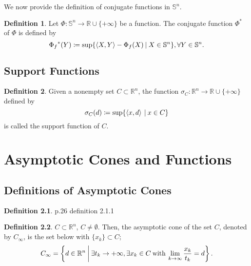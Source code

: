 \documentclass[a4paper,11pt, oneside]{book}
\theoremstyle{definition}
\newtheorem{dfn}{Definition}[section]
\newcommand{\RealNumberSet}{\mathbb{R}}
\newcommand{\NDemenstionalRealEuclideanSpace}{\mathbb{R}^n}
\newcommand{\NDemenstionalRealSymmetricMatrixSpace}{\mathbb{S}^n}
\newcommand{\InnerProduct}[2]{\left\langle {#1},{#2}\right\rangle} %
\newcommand{\ExtendedRealValuedFunction}[2]{{#1}: {#2} \to \RealNumberSet \cup \{+\infty\}}
\newcommand{\ConjugateFunction}[1]{{#1}^*}
\begin{document}
We now provide the definition of conjugate functions in $\NDemenstionalRealSymmetricMatrixSpace$.

\begin{dfn}
  Let $\ExtendedRealValuedFunction{\Phi}{\NDemenstionalRealSymmetricMatrixSpace}$ be a function. The conjugate function $\ConjugateFunction{\Phi}$ of $\Phi$ is defined by
  \begin{equation}
    {\Phi_{f}}^* (Y) \coloneqq \sup \{\InnerProduct{X}{Y} - \Phi_{f} (X) \:|\: X \in \NDemenstionalRealSymmetricMatrixSpace\}, \forall Y \in \NDemenstionalRealSymmetricMatrixSpace. \notag
  \end{equation}
\end{dfn}

\section{Support Functions}

\begin{dfn}
  Given a nonempty set $C \subset \NDemenstionalRealEuclideanSpace$, the function $\ExtendedRealValuedFunction{\sigma_C}{\NDemenstionalRealEuclideanSpace}$ defined by
  \begin{equation}
    \sigma_C (d) \coloneqq \sup\{\InnerProduct{x}{d} \:|\: x \in C\} \notag
  \end{equation}
  is called the support function of $C$.
\end{dfn}

\chapter{Asymptotic Cones and Functions}

\section{Definitions of Asymptotic Cones}

\begin{dfn}
  p.26 definition 2.1.1
\end{dfn}

\begin{dfn}
  $C \subset \mathbb{R}^n$, $C \neq \emptyset$. Then, the asymptotic cone of the set $C$, denoted by $C_\infty$, is the set below with $\{ x_k \} \subset C$;
  \begin{equation}
    C_\infty = \left\{ d \in
    \mathbb{R}^n \:\middle|\: \exists t_k \rightarrow +\infty, \exists x_k \in C \:\text{\rm with}\: \lim_{k \to \infty} \frac{x_k}{t_k} = d \right\}. \notag
  \end{equation}
\end{dfn}
\end{document}
